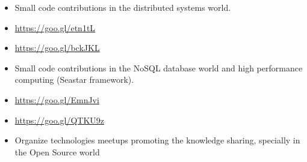 \documentclass[10pt,a4paper]{altacv}
\begin{document}

\begin{itemize}
\item Small code contributions in the distributed systems world.
\item \href{https://goo.gl/etn1tL}{https://goo.gl/etn1tL}
\end{itemize}


\begin{itemize}
\item \href{https://goo.gl/bckJKL}{https://goo.gl/bckJKL}
\end{itemize}

\begin{itemize}
\item Small code contributions in the NoSQL database world and high performance computing (Seastar framework).
\item \href{https://goo.gl/EmnJvi}{https://goo.gl/EmnJvi}
\item \href{https://goo.gl/QTKU9z}{https://goo.gl/QTKU9z}
\end{itemize}


\begin{itemize}
\item Organize technologies meetups promoting the knowledge sharing, specially in the Open Source world
\end{itemize}

\clearpage
\end{document}
